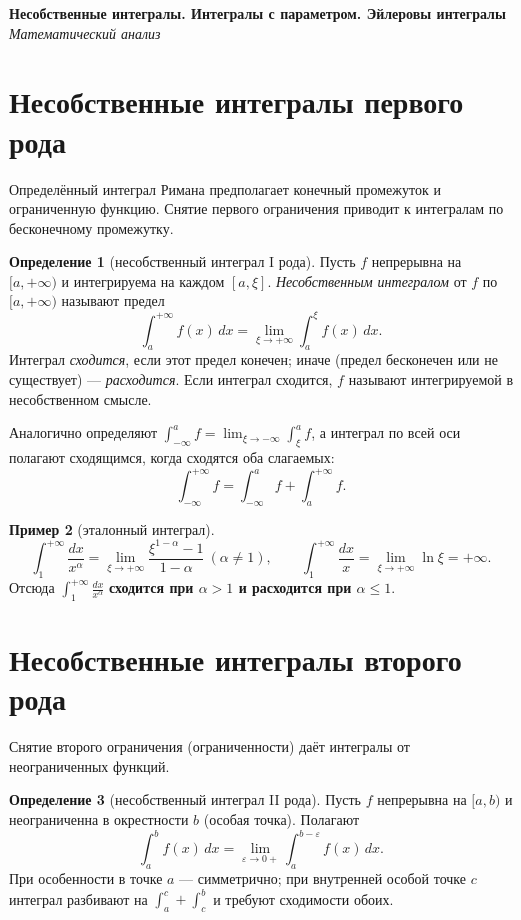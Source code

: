 \documentclass[11pt,a4paper]{article}
\newcommand{\coursename}{Математический анализ}
\newcommand{\doctitle}{Несобственные интегралы. Интегралы с параметром. Эйлеровы интегралы}
\theoremstyle{definition}
\newtheorem{definition}{Определение}[section]
\newtheorem{example}[definition]{Пример}
\theoremstyle{plain}
\newcommand{\dx}{\,dx}
\newcommand{\eps}{\varepsilon}
\renewcommand{\le}{\leqslant}
\begin{document}
\begin{center}
  {\LARGE\bfseries \doctitle}\\[4pt]
  {\large\itshape \coursename}
\end{center}
\vspace{6pt}

\section{Несобственные интегралы первого рода}

Определённый интеграл Римана предполагает конечный промежуток и ограниченную функцию. Снятие
первого ограничения приводит к интегралам по бесконечному промежутку.

\begin{definition}[несобственный интеграл I рода]
Пусть $f$ непрерывна на $[a,+\infty)$ и интегрируема на каждом $[a,\xi]$. \emph{Несобственным
интегралом} от $f$ по $[a,+\infty)$ называют предел
\[
  \int_a^{+\infty}f(x)\dx=\lim_{\xi\to+\infty}\int_a^{\xi}f(x)\dx .
\]
Интеграл \emph{сходится}, если этот предел конечен; иначе (предел бесконечен или не существует) —
\emph{расходится}. Если интеграл сходится, $f$ называют интегрируемой в несобственном смысле.
\end{definition}

Аналогично определяют $\displaystyle\int_{-\infty}^{a}f=\lim_{\xi\to-\infty}\int_\xi^a f$, а
интеграл по всей оси полагают сходящимся, когда сходятся оба слагаемых:
\[
  \int_{-\infty}^{+\infty}f=\int_{-\infty}^{a}f+\int_a^{+\infty}f .
\]

\begin{example}[эталонный интеграл]
\[
  \int_1^{+\infty}\frac{dx}{x^\alpha}=\lim_{\xi\to+\infty}\frac{\xi^{1-\alpha}-1}{1-\alpha}
   \ (\alpha\ne1),\qquad
  \int_1^{+\infty}\frac{dx}{x}=\lim_{\xi\to+\infty}\ln\xi=+\infty .
\]
Отсюда $\displaystyle\int_1^{+\infty}\frac{dx}{x^\alpha}$ \textbf{сходится при $\alpha>1$ и
расходится при $\alpha\le1$}.
\end{example}

\section{Несобственные интегралы второго рода}

Снятие второго ограничения (ограниченности) даёт интегралы от неограниченных функций.

\begin{definition}[несобственный интеграл II рода]
Пусть $f$ непрерывна на $[a,b)$ и неограниченна в окрестности $b$ (особая точка). Полагают
\[
  \int_a^{b}f(x)\dx=\lim_{\eps\to0+}\int_a^{b-\eps}f(x)\dx .
\]
При особенности в точке $a$ — симметрично; при внутренней особой точке $c$ интеграл разбивают на
$\int_a^c+\int_c^b$ и требуют сходимости обоих.
\end{definition}
\end{document}
